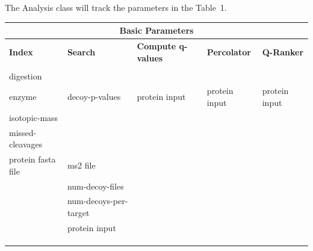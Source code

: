 \documentclass{article}
\begin{document}
The Analysis class will track the parameters in the Table~1.
\begin{table}[b]
\scriptsize
\begin{tabular}{lllll}
\hline
\multicolumn{5}{c}{Basic Parameters} \\
\hline
\textbf{Index}&\textbf{Search}&\textbf{Compute q-values}&\textbf{Percolator} &\textbf{Q-Ranker} \\
\hline \\
digestion            &                                  &                                 &                                 &                                 \\
enzyme               &decoy-p-values                    &protein input                    &protein input                    &protein input                    \\
isotopic-mass        &                                  &                                 &                                 &                                 \\
missed-cleavages     &                                  &                                 &                                 &                                 \\
protein fasta file   &ms2 file                          &                                 &                                 &                                 \\
                     &num-decoy-files                   &                                 &                                 &                                 \\
                     &num-decoys-per-target             &                                 &                                 &                                 \\
                     &protein input                     &                                 &                                 &                                 \\
                     &                                  &                                 &                                 &                                 \\
                     &                                  &                                 &                                 &                                 \\
                     &                                  &                                 &                                 &                                 \\

\end{tabular}
\end{table}
\end{document}
